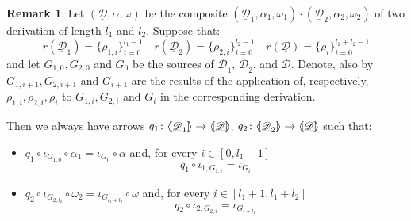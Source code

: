 \documentclass[a4paper]{article}
\newcommand{\dder}[1]{\mathscr{#1}}
\newcommand{\der}[1]{\underline{\dder{#1}}}
\newcommand{\lpro}{\langle \hspace{-1.85pt}[}
\newcommand{\rpro}{]\hspace{-1.85pt}\rangle}
\newcommand{\tpro}[1]{\lpro \der{#1}\rpro}
\theoremstyle{definition}
\newtheorem{remark}[theorem]{Remark}
\begin{document}
\begin{remark}\label{rem:dett}
	Let $(\der{D}, \alpha, \omega)$ be the composite $(\der{D}_1, \alpha_1, \omega_1)\cdot (\der{D}_2, \alpha_2, \omega_2)$ of two derivation of length $l_1$ and $l_2$. Suppose that:
	\[r(\der{D}_1)=\{\rho_{1,i}\}_{i=0}^{l_1-1} \quad r(\der{D}_2)=\{\rho_{2,i}\}_{i=0}^{l_2-1} \quad  r(\der{D})=\{\rho_{i}\}_{i=0}^{l_1+l_2-1}\]
	and let  $G_{1,0}, G_{2,0}$ and $G_{0}$ be the sources of $\der{D}_1$, $\der{D}_2$,  and $\der{D}$.  Denote, also by $G_{1,i+1}, G_{2,i+1}$ and $G_{i+1}$ are the results of the application of, respectively, $\rho_{1,i}, \rho_{2,i}, \rho_i$ to $G_{1,i}, G_{2,i}$ and $G_{i}$  in the corresponding derivation.
	
	Then we always have arrows $q_1\colon \lpro \der{D}_1\rpro \to \tpro{D}$, $q_2\colon \lpro \der{D}_2\rpro \to \tpro{D}$ such that:
	\begin{itemize}
		\item $q_1\circ \iota_{G_{1,0}}\circ \alpha_1 = \iota_{G_{0}}\circ \alpha$ and, for every $i\in [0, l_1-1]$
		\[q_1\circ \iota_{1, G_{1,i}}=\iota_{G_{i}}\]
		\item $q_2\circ \iota_{G_{2,l_2}}\circ \omega_2 = \iota_{G_{l_1+l_2}}\circ \omega$ and, for every $i\in [l_1+1, l_1+l_2]$
		\[q_2\circ \iota_{2, G_{2,i}}=\iota_{G_{i+l_1}}\]
	\end{itemize}


\end{remark}
\end{document}
